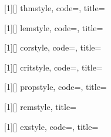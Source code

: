 [1][]{
  thmstyle,
  code={},
  title={\nmThm~\thenoteThm{}}
}

[1][]{
  lemstyle,
  code={},
  title={\nmLemma~\thenoteThm{}}
}

[1][]{
  corstyle,
  code={},
  title={\nmCor~\thenoteThm{}}
}

[1][]{
  critstyle,
  code={},
  title={\nmCri~\thenoteThm{}}
}

[1][]{
  propstyle,
  code={},
  title={\nmPro~\thePro{}}
}

[1][]{
  remstyle,
  title={\nmRmk{}}
}

[1][]{
  exstyle,
  code={},
  title={\nmEx~\theEx{}}
}

\renewcommand{\proofname}{\indent\textbf{\textcolor{thmMain}{\nmProof}}}
\newenvironment{solution}
  {\begin{proof}[\indent\textbf{\textcolor{thmMain}{\nmSol}}]}
  {\end{proof}}
